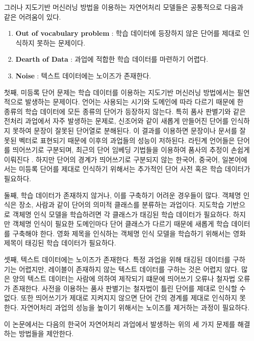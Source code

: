 \documentclass[11pt]{article}
\begin{document}
그러나 지도기반 머신러닝 방법을 이용하는 자연어처리 모델들은 공통적으로 다음과 같은 어려움이 있다.

\begin{enumerate}
    \item \textbf{Out of vocabulary problem} : 학습 데이터에 등장하지 않은 단어를 제대로 인식하지 못하는 문제이다.
    \item \textbf{Dearth of Data} : 과업에 적합한 학습 데이터를 마련하기 어렵다.
    \item \textbf{Noise} : 텍스트 데이터에는 노이즈가 존재한다.
\end{enumerate}

첫째, 미등록 단어 문제는 학습 데이터를 이용하는 지도기반 머신러닝 방법에서는 필연적으로 발생하는 문제이다.
언어는 사용되는 시기와 도메인에 따라 다르기 때문에 한 종류의 학습 데이터에 모든 종류의 단어가 등장하지 않는다.
특히 품사 판별기와 같은 전처리 과업에서 자주 발생하는 문제로, 신조어와 같이 새롭게 만들어진 단어를 인식하지 못하여 문장이 잘못된 단어열로 분해된다.
이 결과를 이용하면 문장이나 문서를 잘못된 벡터로 표현되기 때문에 이후의 과업들의 성능이 저하된다.
라틴계 언어들은 단어를 띄어쓰기로 구분되며, 최근의 단어 임베딩 기법들을 이용하여 품사의 추정이 손쉽게 이뤄진다 \citep{turian2010word, mikolov2013efficient, collobert2011natural}.
하지만 단어의 경계가 띄어쓰기로 구분되지 않는 한국어, 중국어, 일본어에서는 미등록 단어를 제대로 인식하기 위해서는 추가적인 단어 사전 혹은 학습 데이터가 필요하다.

둘째, 학습 데이터가 존재하지 않거나, 이를 구축하기 어려운 경우들이 많다.
객체명 인식은 장소, 사람과 같이 단어의 의미적 클래스를 분류하는 과업이다.
지도학습 기반으로 객체명 인식 모델을 학습하려면 각 클래스가 태깅된 학습 데이터가 필요하다.
하지만 객체명 인식이 필요한 도메인마다 단어 클래스가 다르기 때문에 새롭게 학습 데이터를 구축해야 한다.
영화 제목을 인식하는 객체명 인식 모델을 학습하기 위해서는 영화 제목이 태깅된 학습 데이터가 필요하다.

셋째, 텍스트 데이터에는 노이즈가 존재한다.
특정 과업을 위해 태깅된 데이터를 구하기는 어렵지만, 레이블이 존재하지 않는 텍스트 데이터를 구하는 것은 어렵지 않다.
많은 양의 텍스트 데이터는 사람에 의하여 제작되기 떄문에 띄어쓰기 오류나 철자법 오류가 존재한다.
사전을 이용하는 품사 판별기는 철자법이 틀린 단어를 제대로 인식할 수 없다.
또한 띄어쓰기가 제대로 지켜지지 않으면 단어 간의 경계를 제대로 인식하지 못한다.
자연어처리 과업의 성능을 높이기 위해서는 노이즈를 제거하는 과정이 필요하다.

이 논문에서는 다음의 한국어 자연어처리 과업에서 발생하는 위의 세 가지 문제를 해결하는 방법들을 제안한다.
\end{document}
